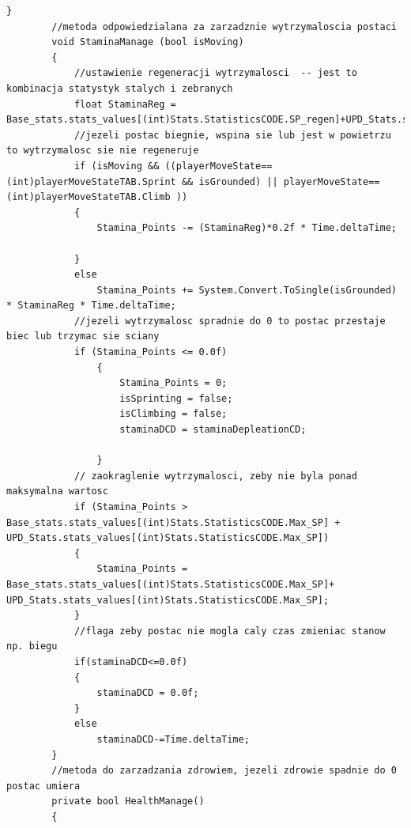 \documentclass[12pt,twoside]{article}
\begin{document}
\begin{lstlisting}[language={[Sharp]C},caption=Skyrpt HeroStatManager,label={HeroScript:HeroStatManager}]
        }
        //metoda odpowiedzialana za zarzadznie wytrzymaloscia postaci
        void StaminaManage (bool isMoving)
        {
            //ustawienie regeneracji wytrzymalosci  -- jest to kombinacja statystyk stalych i zebranych
            float StaminaReg = Base_stats.stats_values[(int)Stats.StatisticsCODE.SP_regen]+UPD_Stats.stats_values[(int)Stats.StatisticsCODE.SP_regen];
            //jezeli postac biegnie, wspina sie lub jest w powietrzu to wytrzymalosc sie nie regeneruje
            if (isMoving && ((playerMoveState==(int)playerMoveStateTAB.Sprint && isGrounded) || playerMoveState==(int)playerMoveStateTAB.Climb ))
            {
                Stamina_Points -= (StaminaReg)*0.2f * Time.deltaTime;         
                
            }
            else
                Stamina_Points += System.Convert.ToSingle(isGrounded) * StaminaReg * Time.deltaTime;
            //jezeli wytrzymalosc spradnie do 0 to postac przestaje biec lub trzymac sie sciany
            if (Stamina_Points <= 0.0f)
                {
                    Stamina_Points = 0;
                    isSprinting = false;
                    isClimbing = false;
                    staminaDCD = staminaDepleationCD;
                    
                }
            // zaokraglenie wytrzymalosci, zeby nie byla ponad maksymalna wartosc
            if (Stamina_Points >  Base_stats.stats_values[(int)Stats.StatisticsCODE.Max_SP] + UPD_Stats.stats_values[(int)Stats.StatisticsCODE.Max_SP])
            {
                Stamina_Points = Base_stats.stats_values[(int)Stats.StatisticsCODE.Max_SP]+ UPD_Stats.stats_values[(int)Stats.StatisticsCODE.Max_SP];
            }
            //flaga zeby postac nie mogla caly czas zmieniac stanow np. biegu
            if(staminaDCD<=0.0f)
            {
                staminaDCD = 0.0f;
            }
            else 
                staminaDCD-=Time.deltaTime;
        }
        //metoda do zarzadzania zdrowiem, jezeli zdrowie spadnie do 0 postac umiera
        private bool HealthManage()
        {
            

\end{lstlisting}
\end{document}
